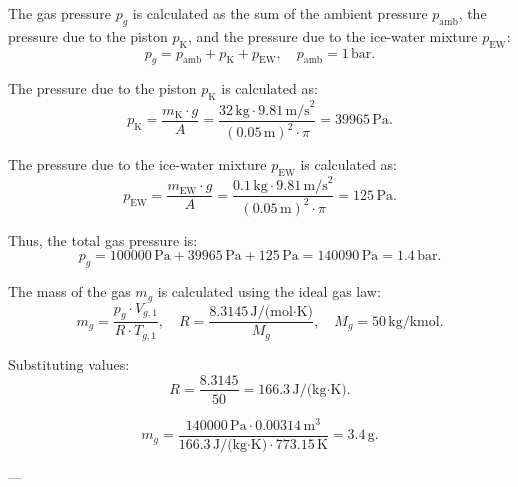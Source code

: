 The gas pressure \( p_{g} \) is calculated as the sum of the ambient pressure \( p_{\text{amb}} \), the pressure due to the piston \( p_{\text{K}} \), and the pressure due to the ice-water mixture \( p_{\text{EW}} \):  
\[
p_{g} = p_{\text{amb}} + p_{\text{K}} + p_{\text{EW}}, \quad p_{\text{amb}} = 1 \, \text{bar}.
\]  

The pressure due to the piston \( p_{\text{K}} \) is calculated as:  
\[
p_{\text{K}} = \frac{m_{\text{K}} \cdot g}{A} = \frac{32 \, \text{kg} \cdot 9.81 \, \text{m/s}^2}{(0.05 \, \text{m})^2 \cdot \pi} = 39965 \, \text{Pa}.
\]  

The pressure due to the ice-water mixture \( p_{\text{EW}} \) is calculated as:  
\[
p_{\text{EW}} = \frac{m_{\text{EW}} \cdot g}{A} = \frac{0.1 \, \text{kg} \cdot 9.81 \, \text{m/s}^2}{(0.05 \, \text{m})^2 \cdot \pi} = 125 \, \text{Pa}.
\]  

Thus, the total gas pressure is:  
\[
p_{g} = 100000 \, \text{Pa} + 39965 \, \text{Pa} + 125 \, \text{Pa} = 140090 \, \text{Pa} = 1.4 \, \text{bar}.
\]  

The mass of the gas \( m_{g} \) is calculated using the ideal gas law:  
\[
m_{g} = \frac{p_{g} \cdot V_{g,1}}{R \cdot T_{g,1}}, \quad R = \frac{8.3145 \, \text{J/(mol·K)}}{M_{g}}, \quad M_{g} = 50 \, \text{kg/kmol}.
\]  

Substituting values:  
\[
R = \frac{8.3145}{50} = 166.3 \, \text{J/(kg·K)}.
\]  

\[
m_{g} = \frac{140000 \, \text{Pa} \cdot 0.00314 \, \text{m}^3}{166.3 \, \text{J/(kg·K)} \cdot 773.15 \, \text{K}} = 3.4 \, \text{g}.
\]  

---